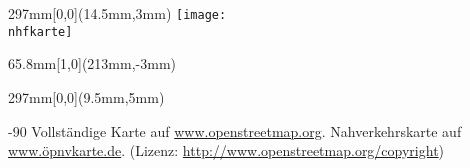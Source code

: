 \documentclass[a4paper]{memoir}
\begin{document}
\pagestyle{empty}


\null
\newpage

\impressum{\redaktionsschluss}
\null
\newpage

\pagestyle{empty}

\begin{textblock*}{297mm}[0,0](14.5mm,3mm)
    \texttt{[image: \\nhfkarte]}
\end{textblock*}

\begin{textblock*}{65.8mm}[1,0](213mm,-3mm)
    \setlength\fboxsep{0pt}
    \setlength\fboxrule{0.4mm}
\end{textblock*}


\begin{textblock*}{297mm}[0,0](9.5mm,5mm)
    \begin{turn}{-90}
        Vollständige Karte auf \url{www.openstreetmap.org}.
        Nahverkehrskarte auf \url{www.öpnvkarte.de}.
		(Lizenz: \url{http://www.openstreetmap.org/copyright})
    \end{turn}
\end{textblock*}
\null
\newpage
\end{document}

